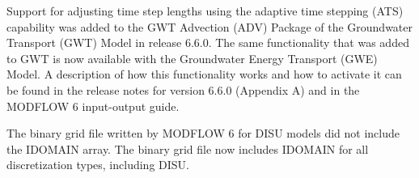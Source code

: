 	
\item \currentmodflowversion
	
	\item Support for adjusting time step lengths using the adaptive time stepping (ATS) capability was added to the GWT Advection (ADV) Package of the Groundwater Transport (GWT) Model in release 6.6.0.  The same functionality that was added to GWT is now available with the Groundwater Energy Transport (GWE) Model.  A description of how this functionality works and how to activate it can be found in the release notes for version 6.6.0 (Appendix A) and in the MODFLOW 6 input-output guide.
	\item The binary grid file written by MODFLOW 6 for DISU models did not include the IDOMAIN array.  The binary grid file now includes IDOMAIN for all discretization types, including DISU.


